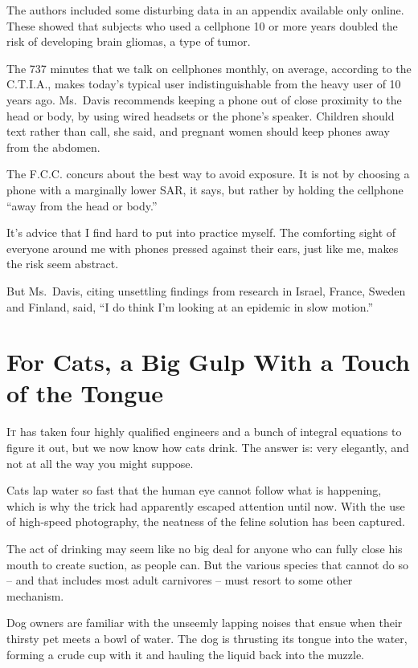 ﻿\documentclass[12pt]{article}
\begin{document}
The authors included some disturbing data in an appendix available only online. These showed that
subjects who used a cellphone 10 or more years doubled the risk of developing brain gliomas, a type
of tumor.

The 737 minutes that we talk on cellphones monthly, on average, according to the C.T.I.A., makes
today's typical user indistinguishable from the heavy user of 10 years ago. Ms.~Davis recommends
keeping a phone out of close proximity to the head or body, by using wired headsets or the phone's
speaker. Children should text rather than call, she said, and pregnant women should keep phones away
from the abdomen.

The F.C.C. concurs about the best way to avoid exposure. It is not by choosing a phone with a
marginally lower SAR, it says, but rather by holding the cellphone ``away from the head or body.''

It's advice that I find hard to put into practice myself. The comforting sight of everyone around me
with phones pressed against their ears, just like me, makes the risk seem abstract.

But Ms.~Davis, citing unsettling findings from research in Israel, France, Sweden and Finland, said,
``I do think I'm looking at an epidemic in slow motion.''

\section{For Cats, a Big Gulp With a Touch of the Tongue}

\lettrine{I}{t} has taken four highly qualified engineers and a bunch of
integral equations to figure it out, but we now know how cats drink. The answer is: very elegantly,
and not at all the way you might suppose.

Cats lap water so fast that the human eye cannot follow what is happening, which is why the trick
had apparently escaped attention until now. With the use of high-speed photography, the neatness of
the feline solution has been captured.

The act of drinking may seem like no big deal for anyone who can fully close his mouth to create
suction, as people can. But the various species that cannot do so -- and that includes most adult
carnivores -- must resort to some other mechanism.

Dog owners are familiar with the unseemly lapping noises that ensue when their thirsty pet meets a
bowl of water. The dog is thrusting its tongue into the water, forming a crude cup with it and
hauling the liquid back into the muzzle.
\end{document}
